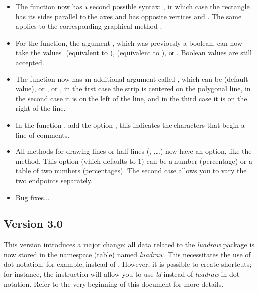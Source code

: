 \begin{itemize}
    \item The  function now has a second possible syntax: , in which case the rectangle has its sides parallel to the axes and has opposite vertices  and . ​​The same applies to the corresponding graphical method .
    
    \item For the  function, the argument , which was previously a boolean, can now take the values ​​ (equivalent to \false),  (equivalent to \true), or . Boolean values ​​are still accepted.
    
    \item The function  now has an additional argument called , which can be  (default value), or , or , in the first case the strip is centered on the polygonal line, in the second case it is on the left of the line, and in the third case it is on the right of the line.

    \item In the function , add the option , this indicates the characters that begin a line of comments.
    
    \item All methods for drawing lines or half-lines (, ,\ldots) now have an  option, like the  method. This option (which defaults to $1$) can be a number (percentage) or a table of two numbers (percentages). The second case allows you to vary the two endpoints separately.

    \item Bug fixes...
\end{itemize}

\subsection{Version 3.0}

This version introduces a major change: all data related to the \emph{luadraw} package is now stored in the namespace (table) named \emph{luadraw}. This necessitates the use of dot notation, for example,  instead of . However, it is possible to create shortcuts; for instance, the instruction  will allow you to use \emph{ld} instead of \emph{luadraw} in dot notation. Refer to the very beginning of this document for more details.

